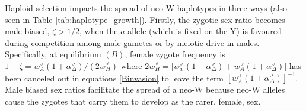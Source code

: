 \documentclass[10pt,letterpaper]{article}
\begin{document}

Haploid selection impacts the spread of neo-W haplotypes in three ways (also seen in Table \ref{tab:haplotype_growth}).
Firstly, the zygotic sex ratio becomes male biased, $\zeta>1/2$, when the $a$ allele (which is fixed on the Y) is favoured during competition among male gametes or by meiotic drive in males.
Specifically, at equilibrium $(B)$, female zygote frequency is $1 - \zeta = w_A^\male (1+\alpha^\male_\Delta) / (2\bar{w}_{H}^\male)$ where $2\bar{w}_{H}^\male= \big[w_a^\male (1-\alpha^\male_\Delta) +  w_A^\male (1+\alpha^\male_\Delta) \big]$ has been canceled out in equations \eqref{Binvasion} to leave the term ${\left[w_{A}^\male (1+\alpha^\male_\Delta) \right]}^{-1}$. 
Male biased sex ratios facilitate the spread of a neo-W because neo-W alleles cause the zygotes that carry them to develop as the rarer, female, sex. 
\end{document}
